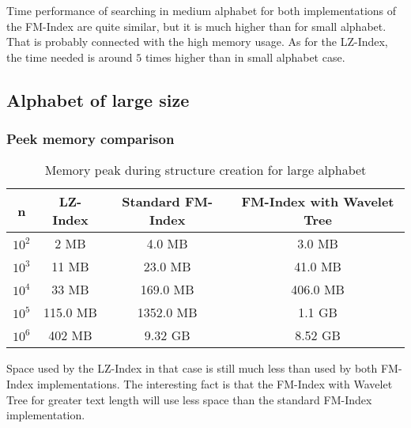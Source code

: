 Time performance of searching in medium alphabet for both implementations of the FM-Index are quite similar, but it is much higher than for small alphabet. That is probably connected with the high memory usage. As for the LZ-Index, the time needed is around $5$ times higher than in small alphabet case.

\subsection{Alphabet of large size}
\subsubsection{Peek memory comparison}

\begin{table}[H]
\begin{center}
\caption{Memory peak during structure creation for large alphabet}
\begin{tabular}{|c|c|c|c|}
\hline
\rowcolor[HTML]{C0C0C0}
n & LZ-Index & Standard FM-Index & FM-Index with Wavelet Tree \\ \hline
$10^{2}$ & 2 MB & 4.0 MB & 3.0 MB \\ \hline
$10^{3}$ & 11 MB & 23.0 MB & 41.0 MB \\ \hline
$10^{4}$ & 33 MB & 169.0 MB & 406.0 MB \\ \hline
$10^{5}$ & 115.0 MB & 1352.0 MB & 1.1 GB \\ \hline
$10^{6}$ & 402 MB & 9.32 GB & 8.52 GB \\ \hline
\end{tabular}
\end{center}
\end{table}

Space used by the LZ-Index in that case is still much less than used by both FM-Index implementations. The interesting fact is that the FM-Index with Wavelet Tree for greater text length will use less space than the standard FM-Index implementation.

